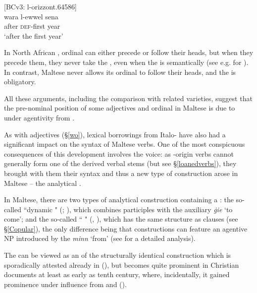 \documentclass[output=paper]{langsci/langscibook}
\begin{document}
\ea\label{wo2}
	{[BCv3: l-orizzont.64586]}\\
	\gll wara l-ewwel sena\\
	after \textsc{def}-first year\\
	\glt `after the first year'\\
\z

In North African , ordinal  can either precede or follow their heads, but when they precede them, they never take the  , even when the  is semantically  (see e.g. \citealt[284]{Ritt-Benmimoun2014} for  ). In contrast, Maltese never allows its ordinal  to follow their heads, and the   is obligatory.

All these arguments, including the comparison with related  varieties, suggest that the pre-nominal position of some adjectives and ordinal  in Maltese is due to  under  agentivity from .

As with adjectives (§\ref{wo}), lexical borrowings from Italo- have also had a significant impact on the syntax of Maltese verbs. One of the most conspicuous consequences of this development involves the  voice: as -origin verbs cannot generally form one of the  derived verbal stems (but see §\ref{loanedverbs}), they brought with them their  syntax and thus a new type of  construction arose in Maltese -- the analytical .

In Maltese, there are two types of analytical  construction containing a  : the so-called ``dynamic " (\citealt[321--324]{Vanhove1993}; \citealt[214]{BorgAzzopardi-Alexander1997}), which combines  participles with the  auxiliary \textit{ġie} `to come'; and the so-called `` " (\citealt[214]{BorgAzzopardi-Alexander1997}, \citealt[318--320]{Vanhove1993}), which has the same structure as  clauses (see §\ref{Copular}), the only difference being that   constructions can feature an agentive NP introduced by the  \textit{minn} `from' (see \citealt[104--107]{bulbul2018} for a detailed analysis).

The   can be viewed as an  of the structurally identical construction which is sporadically attested already in   (\citealt[76--84]{Ullmann1989}), but becomes quite prominent in Christian  documents at least as early as tenth century, where, incidentally, it gained prominence under influence from  and  (\citealt[424]{Blau1967}).
\end{document}
